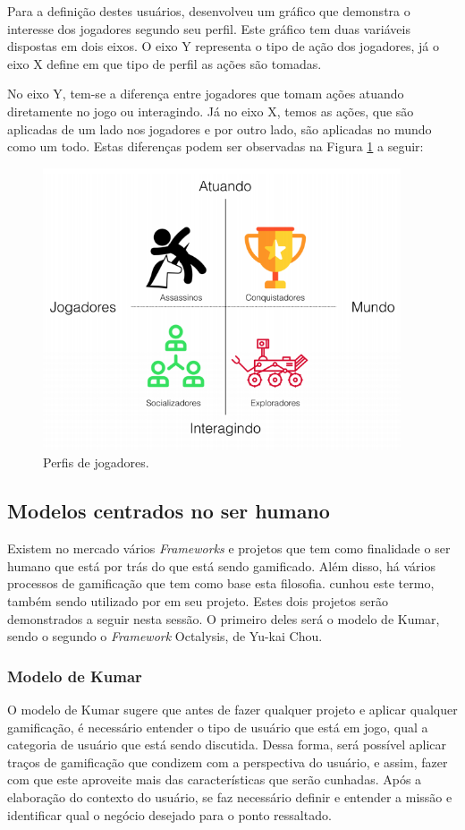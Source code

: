 Para a definição destes usuários, \cite{bartle1996hearts} desenvolveu um gráfico que demonstra o
interesse dos jogadores segundo seu perfil. Este gráfico tem duas variáveis dispostas
em dois eixos. O eixo Y representa o tipo de ação dos jogadores, já o eixo X define
em que tipo de perfil as ações são tomadas.

No eixo Y, tem-se a diferença entre jogadores
que tomam ações atuando diretamente no jogo ou interagindo. Já no eixo X, temos as ações,
que são aplicadas de um lado nos jogadores e por outro lado, são aplicadas no mundo como
um todo. Estas diferenças podem ser observadas na Figura \ref{fig:perfiljogadores} a seguir:

\begin{figure}[h]
    \centering
    \includegraphics[width=400px, scale=1]{figuras/perfiljogadores}
    \caption{Perfis de jogadores.}
    \label{fig:perfiljogadores}
\end{figure}


\subsection{Modelos centrados no ser humano}
\label{sub:modelosnoserhumano}
Existem no mercado vários \textit{Frameworks} e projetos que tem como finalidade o ser
humano que está por trás do que está sendo gamificado. Além disso, há
vários processos de gamificação que tem como base esta filosofia. 
\cite{kumar2013gamification}
cunhou este termo, também sendo utilizado por \cite{chou2015actionable} em seu projeto.
Estes dois projetos serão demonstrados a seguir nesta sessão. O primeiro
deles será o modelo de Kumar, sendo o segundo o \textit{Framework} Octalysis, de Yu-kai Chou.

\subsubsection{Modelo de Kumar}
\label{sub:modelodekumar}
O modelo de Kumar sugere que antes de fazer qualquer projeto e aplicar qualquer gamificação,
é necessário entender o tipo de usuário que está em jogo, qual a categoria de usuário
que está sendo discutida. Dessa forma, será possível aplicar traços de gamificação
que condizem com a perspectiva do usuário, e assim, fazer com que este aproveite
mais das características que serão cunhadas. Após a elaboração do contexto do
usuário, se faz necessário definir e entender a missão e identificar qual o negócio
desejado para o ponto ressaltado.

